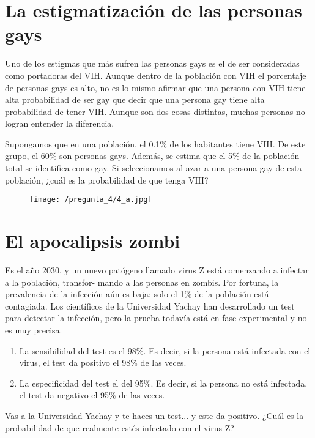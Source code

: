 \documentclass[a4paper]{article}
\begin{document}
\newpage

\section*{La estigmatización de las personas gays}

Uno de los estigmas que más sufren las personas gays es el de ser consideradas como portadoras del VIH. Aunque dentro de la población con VIH el porcentaje de personas gays es alto, no es lo mismo afirmar que una persona con VIH tiene alta probabilidad de ser gay que decir que una persona gay tiene alta probabilidad de tener VIH. Aunque son dos cosas distintas, muchas personas no logran entender la diferencia.

Supongamos que en una población, el 0.1\% de los habitantes tiene VIH. De este grupo, el 60\% son personas gays. Además, se estima que el 5\% de la población total se identifica como gay. Si seleccionamos al azar a una persona gay de esta población, ¿cuál es la probabilidad de que tenga VIH?

\begin{figure}[H]
	\centering
	\texttt{[image: /pregunta\_4/4\_a.jpg]}
\end{figure}


\section*{El  apocalipsis zombi}

Es el año 2030, y un nuevo patógeno llamado virus Z está comenzando a infectar a la población, transfor-
mando a las personas en zombis. Por fortuna, la prevalencia de la infección aún es baja: solo el 1\% de la población está contagiada. Los científicos de la Universidad Yachay han desarrollado un test para detectar la infección, pero la prueba todavía está en fase experimental y no es muy precisa.

\begin{enumerate}[label=•]
	\item La sensibilidad del test es el 98\%. Es decir, si la persona está infectada con el virus, el test da positivo el 98\% de las veces.
	\item La especificidad del test el del 95\%. Es decir, si la persona no está infectada, el test da negativo el 95\% de las veces.
\end{enumerate}

Vas a la Universidad Yachay y te haces un test... y este da positivo. ¿Cuál es la probabilidad de que realmente estés infectado con el virus Z?
\end{document}
